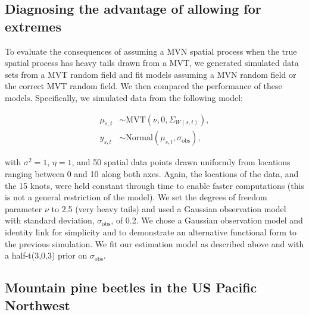 \documentclass[12pt,english]{article}
\begin{document}
\begin{spacing}{1.5}
\subsection{Diagnosing the advantage of allowing for extremes}

To evaluate the consequences of assuming a MVN spatial process when the
true spatial process has heavy tails drawn from a MVT, we generated simulated
data sets from a MVT random field and fit models assuming a
MVN random field or the
correct MVT random field.
We then compared the performance of these models. Specifically, we
simulated data from the following model:

\begin{align}
  \mu_{s,t} &\sim \mathrm{MVT}\left(\nu, 0, \Sigma_{W(s,t)}\right),\\
  y_{s,t} &\sim \mathrm{Normal} \left(\mu_{s,t}, \sigma_{\mathrm{obs}} \right),
\end{align}

\noindent with $\sigma^2 = 1$, $\eta = 1$, and 50 spatial data points drawn uniformly
from locations ranging between 0 and 10 along both axes. Again, the locations
of the data, and the 15 knots, were held constant through time to enable faster
computations (this is not a general restriction of the model).
We set the degrees of freedom parameter $\nu$ to 2.5 (very heavy tails) and used a
Gaussian observation model with standard deviation, $\sigma_{\mathrm{obs}}$, of
0.2. We chose a Gaussian observation
model and identity link for simplicity and to demonstrate an alternative
functional form to the previous simulation. We fit our estimation model as
described above and with a half-t(3,0,3) prior on $\sigma_{\mathrm{obs}}$.

\subsection{Mountain pine beetles in the US Pacific Northwest}


\end{spacing}
\end{document}
